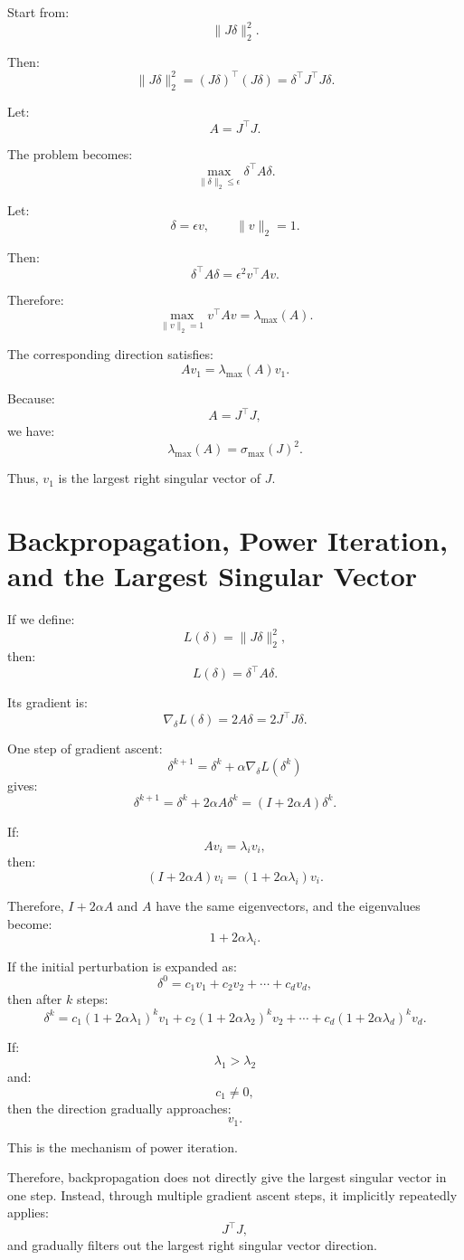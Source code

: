 \documentclass{article}
\begin{document}
Start from:
\[
\|J\delta\|_2^2.
\]

Then:
\[
\|J\delta\|_2^2
=
(J\delta)^\top(J\delta)
=
\delta^\top J^\top J\delta.
\]

Let:
\[
A=J^\top J.
\]

The problem becomes:
\[
\max_{\|\delta\|_2\leq \epsilon}
\delta^\top A\delta.
\]

Let:
\[
\delta=\epsilon v,
\qquad
\|v\|_2=1.
\]

Then:
\[
\delta^\top A\delta
=
\epsilon^2 v^\top A v.
\]

Therefore:
\[
\max_{\|v\|_2=1}
v^\top A v
=
\lambda_{\max}(A).
\]

The corresponding direction satisfies:
\[
Av_1=\lambda_{\max}(A)v_1.
\]

Because:
\[
A=J^\top J,
\]
we have:
\[
\lambda_{\max}(A)=\sigma_{\max}(J)^2.
\]

Thus, \(v_1\) is the largest right singular vector of \(J\).

\section{Backpropagation, Power Iteration, and the Largest Singular Vector}

If we define:
\[
L(\delta)=\|J\delta\|_2^2,
\]
then:
\[
L(\delta)=\delta^\top A\delta.
\]

Its gradient is:
\[
\nabla_\delta L(\delta)=2A\delta=2J^\top J\delta.
\]

One step of gradient ascent:
\[
\delta^{k+1}
=
\delta^k+\alpha\nabla_\delta L(\delta^k)
\]
gives:
\[
\delta^{k+1}
=
\delta^k+2\alpha A\delta^k
=
(I+2\alpha A)\delta^k.
\]

If:
\[
Av_i=\lambda_i v_i,
\]
then:
\[
(I+2\alpha A)v_i
=
(1+2\alpha\lambda_i)v_i.
\]

Therefore, \(I+2\alpha A\) and \(A\) have the same eigenvectors, and the eigenvalues become:
\[
1+2\alpha\lambda_i.
\]

If the initial perturbation is expanded as:
\[
\delta^0
=
c_1v_1+c_2v_2+\cdots+c_dv_d,
\]
then after \(k\) steps:
\[
\delta^k
=
c_1(1+2\alpha\lambda_1)^k v_1
+
c_2(1+2\alpha\lambda_2)^k v_2
+
\cdots
+
c_d(1+2\alpha\lambda_d)^k v_d.
\]

If:
\[
\lambda_1>\lambda_2
\]
and:
\[
c_1\neq 0,
\]
then the direction gradually approaches:
\[
v_1.
\]

This is the mechanism of power iteration.

Therefore, backpropagation does not directly give the largest singular vector in one step. Instead, through multiple gradient ascent steps, it implicitly repeatedly applies:
\[
J^\top J,
\]
and gradually filters out the largest right singular vector direction.
\end{document}
